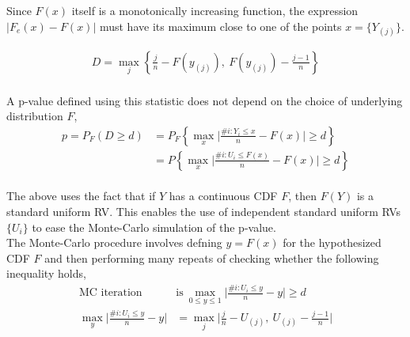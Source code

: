Since $ F(x) $ itself is a monotonically increasing function, the expression $ |F_e (x) - F(x)| $ must have its maximum close to one of the points $ x = \{Y_{(j)}\} $. 

\begin{align}
	D = \max_j \left\{ \frac{j}{n} - F(y_{(j)}),\ F(y_{(j)}) - \frac{j-1}{n} \right\}
\end{align}\\

A p-value defined using this statistic does not depend on the choice of underlying distribution $ F $,\\

\begin{align}
	p = P_F (D \geq d) &= P_F \left\{ \max_x \Bigg| \frac{\#i : Y_i \leq x}{n}  - F(x)\Bigg| \geq d \right\}\\
	&= P \left\{ \max_x \Bigg| \frac{\#i : U_i \leq F(x)}{n}  - F(x)\Bigg| \geq d \right\}
\end{align}\\

The above uses the fact that if $ Y $ has a continuous CDF $ F $, then $ F(Y) $ is a standard uniform RV. This enables the use of independent standard uniform RVs $ \{U_i\} $ to ease the Monte-Carlo simulation of the p-value.\\

The Monte-Carlo procedure involves defning $ y = F(x) $ for the hypothesized CDF $ F $ and then performing many repeats of checking whether the following inequality holds,\\

\begin{align}
	\text{MC iteration } & \text{is}\ \max_{0 \leq y \leq 1} \Bigg| \frac{\#i : U_i \leq y}{n}  - y\Bigg| \geq d \\
	\max_{y} \Bigg| \frac{\#i : U_i \leq y}{n}  - y\Bigg| &= \max_{j} \Bigg| \frac{j}{n} - U_{(j)},\ U_{(j)} - \frac{j-1}{n} \Bigg|
\end{align}

